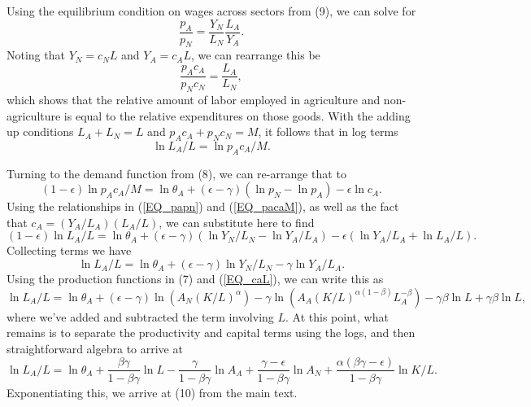 \documentclass[11pt]{article}
\begin{document}
Using the equilibrium condition on wages across sectors from (9), we can solve for 
\begin{equation}
    \frac{p_A}{p_N} = \frac{Y_N}{L_N}\frac{L_A}{Y_A}.\label{EQ_papn}
\end{equation}
Noting that $Y_N = c_N L$ and $Y_A = c_A L$, we can rearrange this be
\begin{equation}
    \frac{p_A c_A}{p_N c_N} = \frac{L_A}{L_N}, \label{EQ_expend}
\end{equation}
which shows that the relative amount of labor employed in agriculture and non-agriculture is equal to the relative expenditures on those goods. With the adding up conditions $L_A + L_N = L$ and $p_Ac_A + p_N c_N = M$, it follows that in log terms
\begin{equation}
    \ln L_A/L = \ln p_A c_A/M. \label{EQ_pacaM}
\end{equation}

Turning to the demand function from (8), we can re-arrange that to
\begin{equation}
   (1-\epsilon) \ln p_A c_A/M = \ln \theta_A  + (\epsilon-\gamma)(\ln p_N - \ln p_A) - \epsilon \ln c_A. \nonumber
\end{equation}
Using the relationships in (\ref{EQ_papn}) and (\ref{EQ_pacaM}), as well as the fact that $c_A = (Y_A/L_A)(L_A/L)$, we can substitute here to find
\begin{equation}
    (1-\epsilon)\ln L_A/L = \ln \theta_A + (\epsilon-\gamma)\left(\ln Y_N/L_N - \ln Y_A/L_A \right) - \epsilon \left(\ln Y_A/L_A + \ln L_A/L \right). \nonumber
\end{equation}
Collecting terms we have
\begin{equation}
    \ln L_A/L = \ln \theta_A + (\epsilon-\gamma) \ln Y_N/L_N - \gamma \ln Y_A/L_A. \nonumber
\end{equation}
Using the production functions in (7) and (\ref{EQ_caL}), we can write this as
\begin{equation}
    \ln L_A/L = \ln \theta_A + (\epsilon-\gamma) \ln \left(A_N (K/L)^{\alpha}\right) - \gamma \ln \left(A_A (K/L)^{\alpha(1-\beta)} L_A^{-\beta}\right) - \gamma \beta \ln L + \gamma \beta \ln L, \nonumber
\end{equation}
where we've added and subtracted the term involving $L$. At this point, what remains is to separate the productivity and capital terms using the logs, and then straightforward algebra to arrive at
\begin{equation}
    \ln L_A/L = \ln \theta_A + \frac{\beta\gamma}{1-\beta\gamma} \ln L - \frac{\gamma}{1-\beta\gamma} \ln A_A + \frac{\gamma - \epsilon}{1-\beta\gamma} \ln A_N + \frac{\alpha(\beta\gamma - \epsilon)}{1-\beta\gamma} \ln K/L. \nonumber
\end{equation}
Exponentiating this, we arrive at (10) from the main text.
\end{document}
